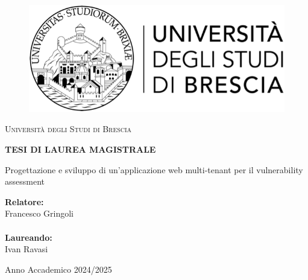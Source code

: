 \begin{titlepage}
    \begin{center}
        \begin{figure}
            \centering
            \includegraphics{img/unibs.png}
        \end{figure}
        {\Large{\textsc{Università degli Studi di Brescia}}\par}
        {\par}
        \vspace{1cm}
        {\small{\bf TESI DI LAUREA MAGISTRALE}}
        \vspace{20mm}
    \end{center}
    \vspace{5mm}
 
    \begin{center}
        {\LARGE Progettazione e sviluppo di un'applicazione web multi-tenant per il vulnerability assessment}
    \end{center}
 
    \vspace{25mm}
    \noindent
        {\large{\bf Relatore:} \\Francesco Gringoli} \\ \\
        {\large{\bf Laureando:} \\Ivan Ravasi}
    \hfill
    \newline
    \vspace{10mm}
 
    \vfill
    \begin{center}
        {\large Anno Accademico 2024/2025}
    \end{center}
\end{titlepage}
\restoregeometry